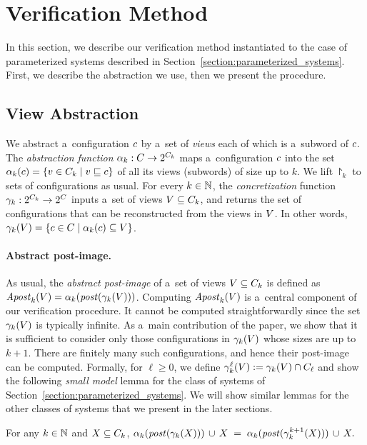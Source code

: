 
\section{Verification Method}
\label{section:verification_method}
\label{section:method}
In this section, we describe our verification method 
instantiated to the case
of parameterized 
systems described in Section~\ref{section:parameterized_systems}.
%
First, we describe the abstraction we use, then we present 
%
the procedure. 
%

\subsection{View Abstraction}\label{section:abstraction}
We abstract a~configuration $\conf$ by a~set of \emph{views}
each of which is a~subword of $\conf$.
%
%
The {\it abstraction function} $\project_k:\confs\rightarrow 2^{\viewsof k}$ maps
a~configuration $\conf$ into the set $\projof \conf k = \{\view\in\viewsof k\mid\view\subword \conf\}$ of all its views (subwords) of size up to $k$.
%
We lift $\project_k$ to sets of configurations as usual.
%
For every $k\in \nat$, the {\it concretization} function 
$\gammaof k:2^{\viewsof k}\rightarrow2^\confs$ inputs
a~set of views $\X\subseteq\viewsof k$, and  returns the set of configurations that can be reconstructed from the views in $\X$.
%
In other words, 
$\gammaof k(V) = \{\conf\in\confs\mid\alpha_k(\conf)\subseteq V\}$.
%

%
\paragraph{Abstract post-image.}
As usual, the \emph{abstract post-image} 
of a~set of views $\X\subseteq\viewsof k$ is defined as 
$\apostof \X k = \projof {\postof {\gammaof k(\X)}} k$.
%
Computing $\apostof {\X} k$ is a~central component of our verification procedure.
%
It cannot be computed straightforwardly since the set $\gammaof k(V)$ is typically infinite.
%
As a~main contribution of the paper, we show that
it is sufficient to consider only those configurations in 
$\gammaof k(\X)$ whose sizes are up to $k+1$.
%
There are finitely many such configurations, and hence their post-image can be computed. 
%
Formally, for $\ell\geq 0$, we define $\gammaof k^\ell (\X):=
\gammaof k(\X)\cap\confsof{\ell}$ 
and show the following {\it small model} lemma for
the class of systems of Section~\ref{section:parameterized_systems}.
%
We will show similar lemmas for the other classes of systems that we
present in the later sections. 
%
\begin{lemma}
\label{lemma:apost}
For any $k\in\nat$ and $X\subseteq\viewsof k$,
$\projof {\postof {\gammaof k(X)}} k\, \cup\, X\;  =\; \alpha_k(\post(\limgammaof k {k+1} (X)))\, \cup\, X.$
\end{lemma}

